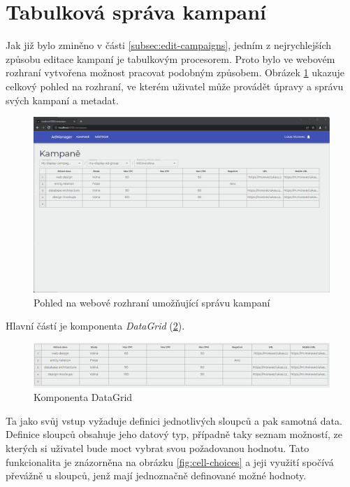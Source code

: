 \section{Tabulková správa kampaní}
Jak již bylo zminěno v části \ref{subsec:edit-campaigns}, jedním z nejrychlejších způsobu editace kampaní je tabulkovým procesorem.
Proto bylo ve webovém rozhraní vytvořena možnost pracovat podobným způsobem. Obrázek \ref{fig:datagrid-window} ukazuje celkový pohled na rozhraní, ve kterém uživatel
může provádět úpravy a správu svých kampaní a metadat.
\begin{figure}[h]
    \centering
    \includegraphics[width=1\textwidth]{Figures/ui/whole-window.png}
    \caption{Pohled na webové rozhraní umožňující správu kampaní}
    \label{fig:datagrid-window}
\end{figure}
Hlavní částí je komponenta \emph{DataGrid} (\ref{fig:datagrid}).
\begin{figure}[h]
    \centering
    \includegraphics[width=1\textwidth]{Figures/ui/datagrid.png}
    \caption{Komponenta DataGrid}
    \label{fig:datagrid}
\end{figure}
Ta jako svůj vstup vyžaduje definici jednotlivých sloupců
a pak samotná data. Definice sloupců obsahuje jeho datový typ, případně taky seznam možností, ze kterých si uživatel bude moct vybrat svou požadovanou hodnotu.
Tato funkcionalita je znázorněna na obrázku \ref{fig:cell-choices} a jeji využití spočívá převážně u sloupců, jenž mají jednoznačně definované možné hodnoty.

